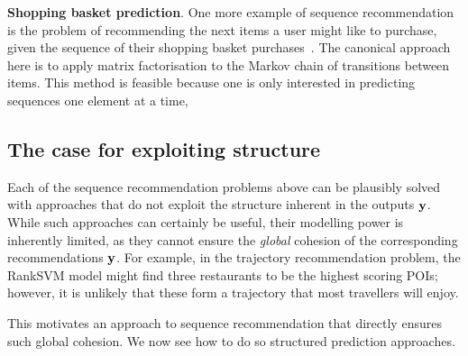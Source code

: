 %
\textbf{Shopping basket prediction}.
One more example of sequence recommendation is the problem of recommending the next items a user might like to purchase, given the sequence of their shopping basket purchases~\citep{Rendle:2010,Wang:2015}.
The canonical approach here is to apply matrix factorisation to the Markov chain of transitions between items.
This method is feasible because one is only interested in predicting sequences one element at a time, 


%
\subsection{The case for exploiting structure}

Each of the sequence recommendation problems above can be plausibly solved with approaches that do not exploit the structure inherent in the outputs $\mathbf{y}$. %
While such approaches can certainly be useful,
their modelling power is inherently limited,
as
they cannot ensure the \emph{global} cohesion of the corresponding recommendations $\mathbf{y}$.
For example, in the trajectory recommendation problem, the RankSVM model %
might find three restaurants to be the highest scoring POIs;
however, it is unlikely that these form a trajectory that most travellers will enjoy.

This motivates an approach to sequence recommendation that directly ensures such global cohesion.
We now see how to do so  structured prediction approaches. %



%

